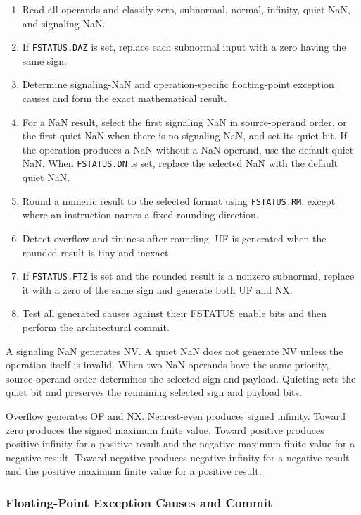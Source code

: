 \begin{enumerate}
\item Read all operands and classify zero, subnormal, normal, infinity, quiet NaN, and signaling NaN.
\item If \texttt{FSTATUS.DAZ} is set, replace each subnormal input with a zero having the same sign.
\item Determine signaling-NaN and operation-specific floating-point exception causes and form the exact mathematical result.
\item For a NaN result, select the first signaling NaN in source-operand order, or the first quiet NaN when there is
no signaling NaN, and set its quiet bit. If the operation produces a NaN without a NaN operand, use the default
quiet NaN. When \texttt{FSTATUS.DN} is set, replace the selected NaN with the default quiet NaN.
\item Round a numeric result to the selected format using \texttt{FSTATUS.RM}, except where an instruction names a
fixed rounding direction.
\item Detect overflow and tininess after rounding. UF is generated when the rounded result is tiny and inexact.
\item If \texttt{FSTATUS.FTZ} is set and the rounded result is a nonzero subnormal, replace it with a zero of the
same sign and generate both UF and NX.
\item Test all generated causes against their FSTATUS enable bits and then perform the architectural commit.
\end{enumerate}

A signaling NaN generates NV. A quiet NaN does not generate NV unless the operation itself is invalid. When two
NaN operands have the same priority, source-operand order determines the selected sign and payload. Quieting sets
the quiet bit and preserves the remaining selected sign and payload bits.

Overflow generates OF and NX. Nearest-even produces signed infinity. Toward zero produces the signed maximum finite
value. Toward positive produces positive infinity for a positive result and the negative maximum finite value for a
negative result. Toward negative produces negative infinity for a negative result and the positive maximum finite
value for a positive result.

\subsubsection{Floating-Point Exception Causes and Commit}

